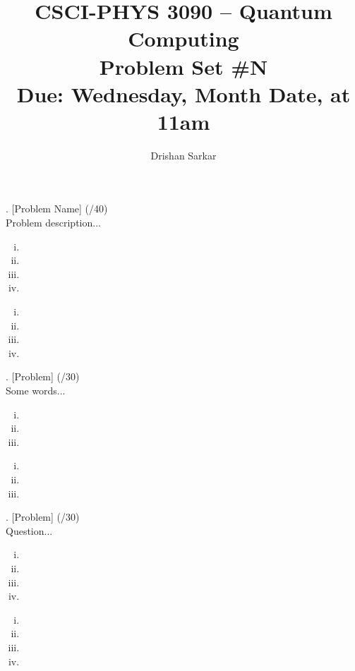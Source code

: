 \documentclass[11pt]{article}
\newenvironment{solution}{\begin{mdframed}[skipabove=\baselineskip,innertopmargin=\baselineskip,innerbottommargin=\baselineskip]
  }{\end{mdframed}}
\begin{document}
\date{}
\author{Drishan Sarkar}
\title{CSCI-PHYS 3090 -- Quantum Computing \\ Problem Set \#N \\ Due: Wednesday, Month Date, at 11am}
\maketitle

. [Problem Name] (/40)
\\
Problem description...

\begin{enumerate}[(i)]
    \item
    \item
    \item
    \item 
\end{enumerate}

\begin{solution}
\begin{enumerate}[(i)]
    \item
    \item
    \item
    \item 
\end{enumerate}
\end{solution}

\newpage

. [Problem] (/30)
\\
Some words...

\begin{enumerate}[(i)]
\item 
\item
\item
\end{enumerate}

\begin{solution}
\begin{enumerate}[(i)]
    \item 
    \item 
    \item
\end{enumerate}
\end{solution}

\newpage

. [Problem] (/30)
\\
Question...

\begin{enumerate}[(i)] 
\item
\item 
\item
\item
\end{enumerate}

\begin{solution}
\begin{enumerate}[(i)]
    \item
    \item
    \item 
    \item 
\end{enumerate}
\end{solution}

\end{document}
